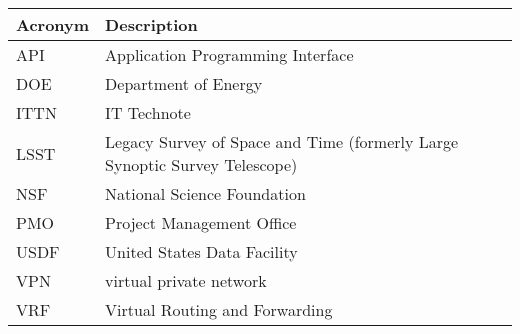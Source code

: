 \addtocounter{table}{-1}
\begin{longtable}{p{}p{}}\hline
\textbf{Acronym} & \textbf{Description}  \\\hline

API & Application Programming Interface \\\hline
DOE & Department of Energy \\\hline
ITTN & IT Technote \\\hline
LSST & Legacy Survey of Space and Time (formerly Large Synoptic Survey Telescope) \\\hline
NSF & National Science Foundation \\\hline
PMO & Project Management Office \\\hline
USDF & United States Data Facility \\\hline
VPN & virtual private network \\\hline
VRF & Virtual Routing and Forwarding \\\hline
\end{longtable}
